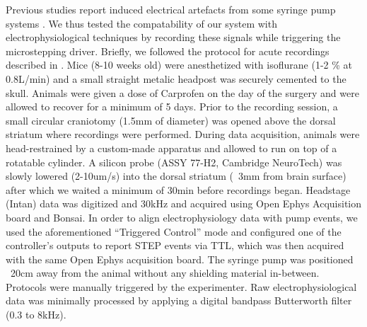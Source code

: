 Previous studies report induced electrical artefacts from some syringe pump systems . We thus tested the compatability of our system with electrophysiological techniques by recording these signals while triggering the microstepping driver. 
Briefly, we followed the protocol for acute recordings described in \cite{Cruz2022}. Mice (8-10 weeks old) were anesthetized with isoflurane (1-2 \% at 0.8L/min) and a small straight metalic headpost was securely cemented to the skull. Animals were given a dose of Carprofen on the day of the surgery and were allowed to recover for a minimum of 5 days. Prior to the recording session, a small circular craniotomy (1.5mm of diameter) was opened above the dorsal striatum where recordings were performed. During data acquisition, animals were head-restrained by a custom-made apparatus and allowed to run on top of a rotatable cylinder. A silicon probe (ASSY 77-H2, Cambridge NeuroTech) was slowly lowered (2-10um/s) into the dorsal striatum (~3mm from brain surface) after which we waited a minimum of 30min before recordings began. Headstage (Intan) data was digitized and 30kHz and acquired using Open Ephys Acquisition board and Bonsai. In order to align electrophysiology data with pump events, we used the aforementioned “Triggered Control” mode and configured one of the controller’s outputs to report STEP events via TTL, which was then acquired with the same Open Ephys acquisition board. The syringe pump was positioned ~20cm away from the animal without any shielding material in-between. Protocols were manually triggered by the experimenter.
Raw electrophysiological data was minimally processed by applying a digital bandpass Butterworth filter (0.3 to 8kHz).


